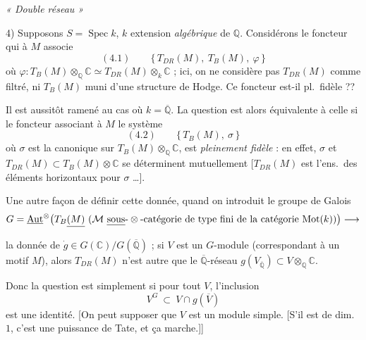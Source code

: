 \documentclass[11pt,a4paper]{article}
\begin{document}

\emph{« Double réseau »}

4) Supposons $S = \operatorname{Spec} k$, $k$  extension
\emph{algébrique} de $\mathbb{Q}$. Considérons le foncteur qui à $M$ associe
\[ (4.1) \qquad \{\, T_{DR}(M),\ T_{B}(M),\ \varphi \,\} \]
où $\varphi : T_{B}(M) \otimes_{\mathbb{Q}} \mathbb{C} \simeq
T_{DR}(M) \otimes_{k} \mathbb{C}$ ; ici, on ne considère pas $T_{DR}(M)$ comme
filtré,  ni $T_{B}(M)$ muni d'une structure de Hodge. Ce foncteur
est-il pl.\ fidèle ??

 Il est aussitôt ramené au cas où
$k = \overline{\mathbb{Q}}$. La question est alors équivalente à celle si le
foncteur associant à $M$ le système
\[ (4.2) \qquad \{\, T_{B}(M),\ \sigma \,\} \]
où $\sigma$ est la  canonique sur $T_{B}(M) \otimes_{\mathbb{Q}} \mathbb{C}$,
est \emph{pleinement fidèle} : en effet, $\sigma$ et $T_{DR}(M) \subset
T_{B}(M) \otimes \mathbb{C}$ se déterminent mutuellement
[$T_{DR}(M)$ est l'ens.\ des éléments  horizontaux pour $\sigma$ …].

Une autre façon de définir cette
donnée,  quand on introduit le groupe de Galois
\[ G = \underline{\operatorname{Aut}}^{\otimes}\bigl( T_{B}\struck{(M)} \ (\mathcal{M} \text{ \uncertain{sous}-}\otimes\text{-catégorie de type fini de la catégorie } \mathrm{Mot}(k)) \bigr) \longrightarrow \]
la donnée de
$\dot{g} \in G(\mathbb{C})/G(\overline{\mathbb{Q}})$ ; si $V$ est un
$G$-module (correspondant à un motif $M$), alors $T_{DR}(M)$ n'est autre que le
$\overline{\mathbb{Q}}$-réseau $g(V_{\overline{\mathbb{Q}}}) \subset
V \otimes_{\mathbb{Q}} \mathbb{C}$.

Donc la question est simplement si pour tout $V$, l'inclusion
\[ V^{G} \ \subset \ V \cap g(\overline{V}) \]
est une identité. [On peut supposer que $V$ est un module simple.
[S'il est de dim.\ $1$, c'est une puissance de Tate, et ça marche.]]



\end{document}
